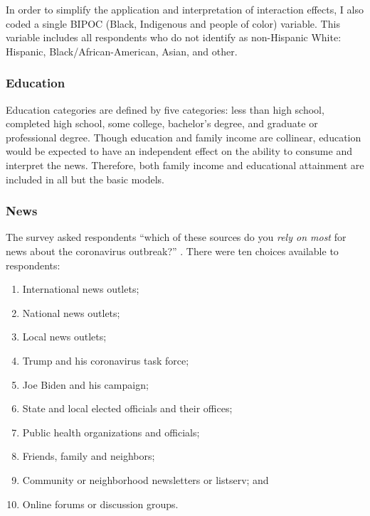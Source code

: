 \documentclass[11pt]{article}
\begin{document}
In order to simplify the application and interpretation of interaction effects, I also coded a single BIPOC (Black, Indigenous and people of color) variable. This variable includes all respondents who do not identify as non-Hispanic White: Hispanic, Black/African-American, Asian, and other.


\subsubsection{Education}\label{sec:education-vars}

Education categories are defined by five categories: less than high school, completed high school, some college, bachelor's degree, and graduate or professional degree. Though education and family income are collinear, education would be expected to have an independent effect on the ability to consume and interpret the news. Therefore, both family income and educational attainment are included in all but the basic models.

\subsubsection{News}

The survey asked respondents ``which of these sources do you \emph{rely on most} for news about the coronavirus outbreak?'' \citep{PewJune2020,Shearer2020}. There were ten choices available to respondents:

\begin{enumerate}
\def\labelenumi{(\arabic{enumi})}
    \item International news outlets;
    \item National news outlets;
    \item Local news outlets;
    \item Trump and his coronavirus task force;
    \item Joe Biden and his campaign;
    \item State and local elected officials and their offices;
    \item Public health organizations and officials;
    \item Friends, family and neighbors;
    \item Community or neighborhood newsletters or listserv; and
    \item Online forums or discussion groups.
\end{enumerate}
\end{document}
